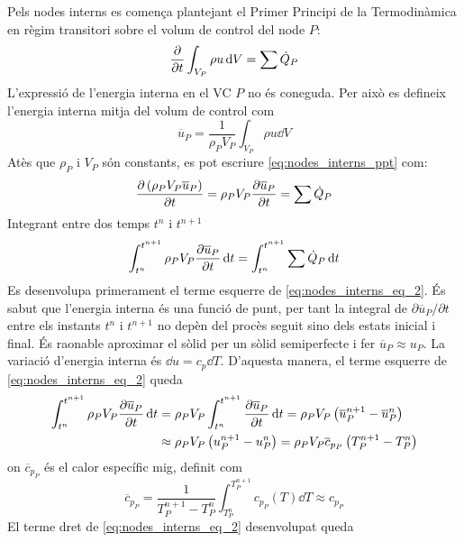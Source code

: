 Pels nodes interns es comença plantejant el Primer Principi de la Termodinàmica en règim transitori sobre el volum de control del node $P$:
\begin{equation} \label{eq:nodes_interns_ppt}
	\pdv{t} \int_{V_P} \rho u \dd{V} = \sum \dot{Q}_P
\end{equation}
L'expressió de l'energia interna en el VC $P$ no és coneguda. Per això es defineix l'energia interna mitja del volum de control com
\begin{equation}
	\overline{u}_P = \frac{1}{\rho_P V_P} \int_{V_P} \rho u \dd{V}
\end{equation}
Atès que $\rho_P$ i $V_P$ són constants, es pot escriure \eqref{eq:nodes_interns_ppt} com:
\begin{equation} 
	\pdv{\left(\rho_P V_P \overline{u}_P\right)}{t} = 
	\rho_P V_P \pdv{\overline{u}_P}{t} =
	\sum \dot{Q}_P
\end{equation}
Integrant entre dos temps $t^n$ i $t^{n+1}$
\begin{equation} \label{eq:nodes_interns_eq_2}
	\int_{t^n}^{t^{n+1}} \rho_P V_P \pdv{\overline{u}_P}{t} \dd{t} = 
	\int_{t^n}^{t^{n+1}} \sum \dot{Q}_P \dd{t}
\end{equation}
Es desenvolupa primerament el terme esquerre de \eqref{eq:nodes_interns_eq_2}. És sabut que l'energia interna és una funció de punt, per tant la integral de $\partial \overline{u}_P / \partial t$ entre els instants $t^n$ i $t^{n+1}$ no depèn del procès seguit sino dels estats inicial i final. És raonable aproximar el sòlid per un sòlid semiperfecte i fer $\overline{u}_P \approx u_P$. La variació d'energia interna és $\dd{u} = c_p \dd{T}$. D'aquesta manera, el terme esquerre de \eqref{eq:nodes_interns_eq_2} queda
\begin{align}
	\int_{t^n}^{t^{n+1}} \rho_P V_P \pdv{\overline{u}_P}{t} \dd{t} 			&= 
	\rho_P V_P  \int_{t^n}^{t^{n+1}} \pdv{\overline{u}_P}{t} \dd{t} = 
	\rho_P V_P \left( \overline{u}_P^{n+1} - \overline{u}_P^n \right) \nonumber  \\ 	&\approx 
	\rho_P V_P \left( u_P^{n+1} - u_P^n \right) = 
	\rho_P V_P \overline{c}_{p_P} \left( T_P^{n+1} - T_P^n \right) \label{eq:nodes_interns_terme_esquerre}
\end{align}
on $\overline{c}_{p_P}$ és el calor específic mig, definit com
\begin{equation}
	\overline{c}_{p_P} = 
	\frac{1}{T_P^{n+1} - T_P^n} \int_{T_P^n}^{T_P^{n+1}} c_{p_P}(T) \dd{T} \approx c_{p_P}
\end{equation}
El terme dret de \eqref{eq:nodes_interns_eq_2} desenvolupat queda

